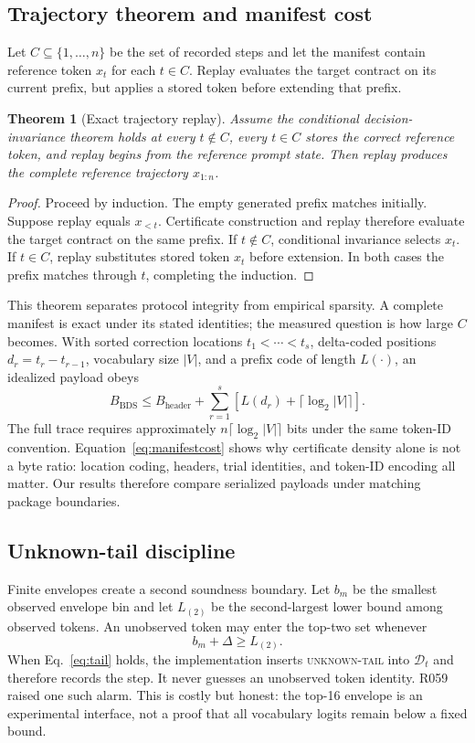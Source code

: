 \documentclass[sigconf,review,nonacm]{acmart}
\newtheorem{theorem}{Theorem}
\newcommand{\DecisionSet}{\mathcal{D}}
\begin{document}
\subsection{Trajectory theorem and manifest cost}
Let $C\subseteq\{1,\ldots,n\}$ be the set of recorded steps and let the manifest contain reference token $x_t$ for each $t\in C$. Replay evaluates the target contract on its current prefix, but applies a stored token before extending that prefix.

\begin{theorem}[Exact trajectory replay]
Assume the conditional decision-invariance theorem holds at every $t\notin C$, every $t\in C$ stores the correct reference token, and replay begins from the reference prompt state. Then replay produces the complete reference trajectory $x_{1:n}$.
\end{theorem}
\begin{proof}
Proceed by induction. The empty generated prefix matches initially. Suppose replay equals $x_{<t}$. Certificate construction and replay therefore evaluate the target contract on the same prefix. If $t\notin C$, conditional invariance selects $x_t$. If $t\in C$, replay substitutes stored token $x_t$ before extension. In both cases the prefix matches through $t$, completing the induction.
\end{proof}

This theorem separates protocol integrity from empirical sparsity. A complete manifest is exact under its stated identities; the measured question is how large $C$ becomes. With sorted correction locations $t_1<\cdots<t_s$, delta-coded positions $d_r=t_r-t_{r-1}$, vocabulary size $|V|$, and a prefix code of length $L(\cdot)$, an idealized payload obeys
\begin{equation}
  B_{\mathrm{BDS}}\le B_{\mathrm{header}}+
  \sum_{r=1}^{s}\left[L(d_r)+\lceil\log_2|V|\rceil\right].
  \label{eq:manifestcost}
\end{equation}
The full trace requires approximately $n\lceil\log_2|V|\rceil$ bits under the same token-ID convention. Equation~\eqref{eq:manifestcost} shows why certificate density alone is not a byte ratio: location coding, headers, trial identities, and token-ID encoding all matter. Our results therefore compare serialized payloads under matching package boundaries.

\subsection{Unknown-tail discipline}
Finite envelopes create a second soundness boundary. Let $b_m$ be the smallest observed envelope bin and let $L_{(2)}$ be the second-largest lower bound among observed tokens. An unobserved token may enter the top-two set whenever
\begin{equation}
  b_m+\Delta\ge L_{(2)}.
  \label{eq:tail}
\end{equation}
When Eq.~\eqref{eq:tail} holds, the implementation inserts \textsc{unknown-tail} into $\DecisionSet_t$ and therefore records the step. It never guesses an unobserved token identity. R059 raised one such alarm. This is costly but honest: the top-16 envelope is an experimental interface, not a proof that all vocabulary logits remain below a fixed bound.
\end{document}
